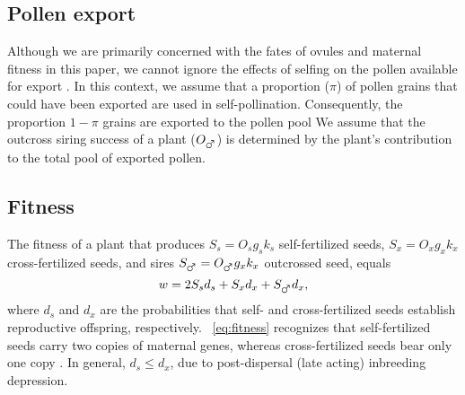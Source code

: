 \documentclass[letterpaper,titlepage]{scrartcl}
\begin{document}
\subsection{Pollen export}
Although we are primarily concerned with the fates of ovules and
maternal fitness in this paper, we cannot ignore the effects of
selfing on the pollen available for export \citetext{pollen
  discounting; \citealp{Harder98}; for further discussion of pollen
  fates, see \citealp{Harder00a}}. In this context, we assume that a
proportion ($\pi$) of pollen grains that could have been exported are
used in self-pollination. Consequently, the proportion $1-\pi$ grains
are exported to the pollen pool
We assume that the outcross siring success of a plant ($O_{\mars}$) is
determined by the plant's contribution to the total pool of exported
pollen.


\subsection{Fitness}
The fitness of a plant that produces $S_{s}=O_{s}g_{s}k_{s}$
self-fertilized seeds, $S_{x}=O_{x}g_{x}k_{x}$ cross-fertilized seeds,
and sires $S_{\mars}=O_{\mars}g_{x}k_{x}$ outcrossed seed, equals
\begin{equation}\label{eq:fitness}
  w=2S_{s}d_{s}+S_{x}d_{x}+S_{\mars}d_{x},
\end{equation}
where $d_{s}$ and $d_{x}$ are the probabilities that self- and
cross-fertilized seeds establish reproductive offspring,
respectively. {\eref}~\ref{eq:fitness} recognizes that self-fertilized
seeds carry two copies of maternal genes, whereas cross-fertilized
seeds bear only one copy \citep{Fisher41}. In general, $d_{s} \leq
d_{x}$, due to post-dispersal (late acting) inbreeding
depression.%
\end{document}
